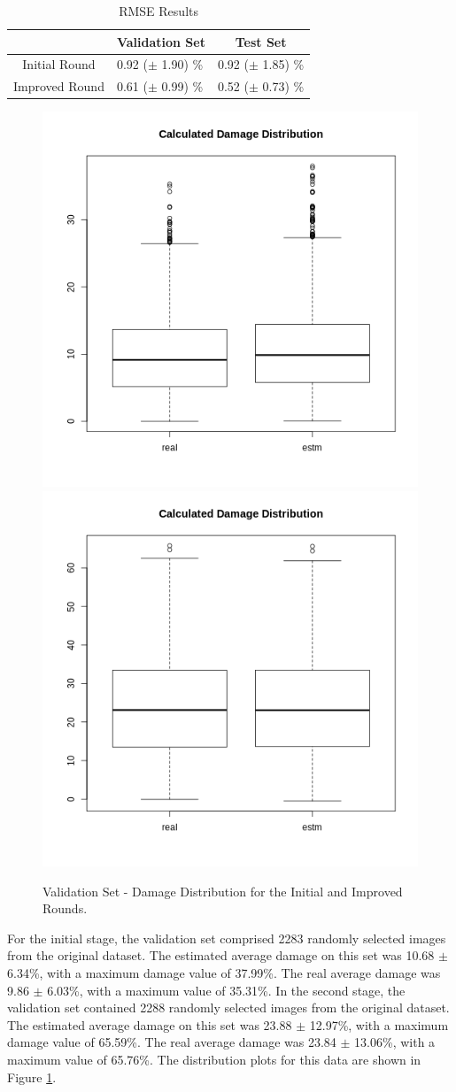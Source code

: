 \begin{table}[h!]
\caption{\label{tab:RMSE} RMSE Results}
\centering
\begin{tabular}{|l|l|l}
\hline
 & \multicolumn{1}{|c|}{Validation Set} & \multicolumn{1}{c|}{Test Set} \\ \hline
\multicolumn{1}{|c|}{Initial Round} & 0.92 ($\pm$ 1.90) \%& \multicolumn{1}{c|}{0.92 ($\pm$ 1.85) \%}\\ \hline
\multicolumn{1}{|c|}{Improved Round} & 0.61 ($\pm$ 0.99) \%& \multicolumn{1}{c|}{0.52 ($\pm$ 0.73) \%}\\ \hline
\end{tabular}
\end{table}


\begin{figure}[h!]
    \centering
    \includegraphics[width = .45\linewidth]{Figures/v1-val-dmgdst.png}
    \includegraphics[width = .45\linewidth]{Figures/v2-val-dmgdst.png}
    \caption{Validation Set - Damage Distribution for the Initial and Improved Rounds. }
    \label{fig:validation_dist}
\end{figure}

For the initial stage, the validation set comprised 2283 randomly selected images from the original dataset. The estimated average damage on this set was 10.68 $\pm$ 6.34\%, with a maximum damage value of 37.99\%. The real average damage was 9.86 $\pm$ 6.03\%, with a maximum value of 35.31\%. In the second stage, the validation set contained 2288 randomly selected images from the original dataset. The estimated average damage on this set was 23.88 $\pm$ 12.97\%, with a maximum damage value of 65.59\%. The real average damage was 23.84 $\pm$ 13.06\%, with a maximum value of 65.76\%. The distribution plots for this data are shown in Figure \ref{fig:validation_dist}.

